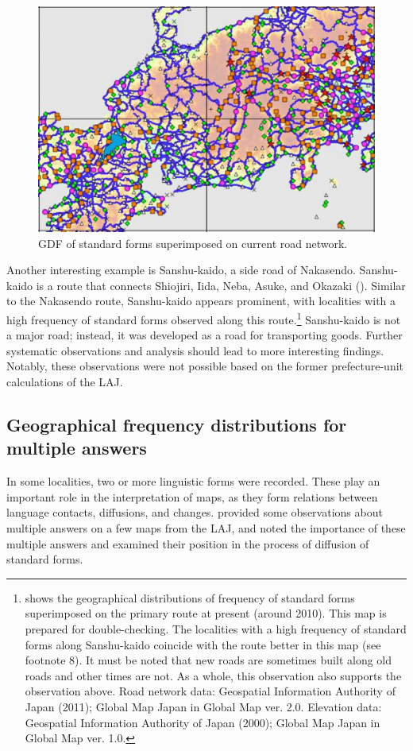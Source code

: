 \documentclass[output=paper]{LSP/langsci}
\begin{document}
\begin{figure}
\includegraphics[width=\textwidth]{illustrations/kuma_fig13}
\caption{GDF of standard forms superimposed on current road network.}          
\label{fig:kuma:13}
\end{figure}

\clearpage

Another interesting example is Sanshu-kaido, a side road of Nakasendo. Sanshu-kaido is a route that connects Shiojiri, Iida, Neba, Asuke, and Okazaki (). Similar to the Nakasendo route, Sanshu-kaido appears prominent, with localities with a high frequency of standard forms observed along this route.\footnote{ shows the geographical distributions of frequency of standard forms superimposed on the primary route at present (around 2010). This map is prepared for double-checking. The localities with a high frequency of standard forms along Sanshu-kaido coincide with the route better in this map (see footnote 8). It must be noted that new roads are sometimes built along old roads and other times are not. As a whole, this observation also supports the observation above. Road network data: Geospatial Information Authority of Japan (2011); Global Map Japan in Global Map ver. 2.0. Elevation data: Geospatial Information Authority of Japan (2000); Global Map Japan in Global Map ver. 1.0.} Sanshu-kaido is not a major road; instead, it was developed as a road for transporting goods. Further systematic observations and analysis should lead to more interesting findings. Notably, these observations were not possible based on the former prefecture-unit calculations of the LAJ.

 
\subsection{Geographical frequency distributions for multiple answers} 
In some localities, two or more linguistic forms were recorded. These  play an important role in the interpretation of maps, as they form relations between language contacts, diffusions, and changes. \citet{inagaki_hogen_1980} provided some observations about multiple answers on a few maps from the LAJ, and \citet{inoue_heiyo_2004} noted the importance of these multiple answers and examined their position in the process of diffusion of standard forms.
\end{document}
